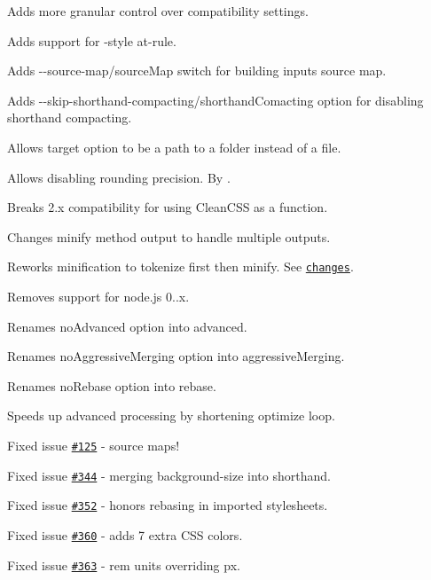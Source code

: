 \begin{DoxyItemize}
\item Adds more granular control over compatibility settings.
\item Adds support for -\/style at-\/rule.
\item Adds {\ttfamily -\/-\/source-\/map}/{\ttfamily source\+Map} switch for building input\textquotesingle{}s source map.
\item Adds {\ttfamily -\/-\/skip-\/shorthand-\/compacting}/{\ttfamily shorthand\+Comacting} option for disabling shorthand compacting.
\item Allows {\ttfamily target} option to be a path to a folder instead of a file.
\item Allows disabling rounding precision. By \href{https://github.com/superlukas}{\tt }.
\item Breaks 2.\+x compatibility for using Clean\+C\+SS as a function.
\item Changes {\ttfamily minify} method output to handle multiple outputs.
\item Reworks minification to tokenize first then minify. See \href{https://github.com/jakubpawlowicz/clean-css/compare/b06f37d...dd8c14a}{\tt changes}.
\item Removes support for node.\+js 0..\+x.
\item Renames {\ttfamily no\+Advanced} option into {\ttfamily advanced}.
\item Renames {\ttfamily no\+Aggressive\+Merging} option into {\ttfamily aggressive\+Merging}.
\item Renames {\ttfamily no\+Rebase} option into {\ttfamily rebase}.
\item Speeds up advanced processing by shortening optimize loop.
\item Fixed issue \href{https://github.com/jakubpawlowicz/clean-css/issues/125}{\tt \#125} -\/ source maps!
\item Fixed issue \href{https://github.com/jakubpawlowicz/clean-css/issues/344}{\tt \#344} -\/ merging {\ttfamily background-\/size} into shorthand.
\item Fixed issue \href{https://github.com/jakubpawlowicz/clean-css/issues/352}{\tt \#352} -\/ honors rebasing in imported stylesheets.
\item Fixed issue \href{https://github.com/jakubpawlowicz/clean-css/issues/360}{\tt \#360} -\/ adds 7 extra C\+SS colors.
\item Fixed issue \href{https://github.com/jakubpawlowicz/clean-css/issues/363}{\tt \#363} -\/ {\ttfamily rem} units overriding {\ttfamily px}.

\end{DoxyItemize}
